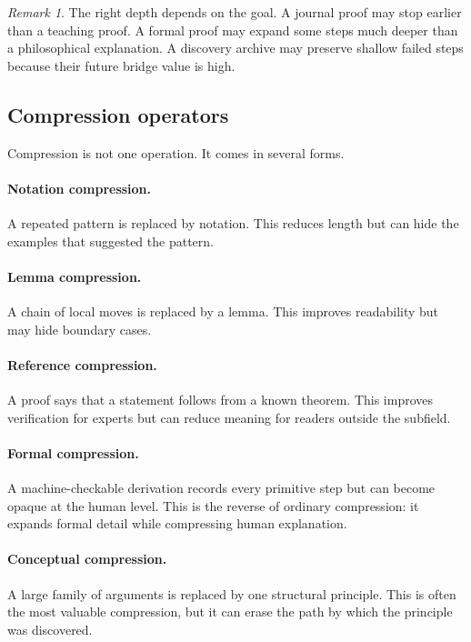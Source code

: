 \documentclass[11pt]{article}
\theoremstyle{definition}
\theoremstyle{remark}
\newtheorem{remark}[theorem]{Remark}
\begin{document}
\begin{remark}
The right depth depends on the goal.  A journal proof may stop earlier than a teaching proof.  A formal proof may expand some steps much deeper than a philosophical explanation.  A discovery archive may preserve shallow failed steps because their future bridge value is high.
\end{remark}

\subsection{Compression operators}

Compression is not one operation.  It comes in several forms.

\paragraph{Notation compression.}
A repeated pattern is replaced by notation.  This reduces length but can hide the examples that suggested the pattern.

\paragraph{Lemma compression.}
A chain of local moves is replaced by a lemma.  This improves readability but may hide boundary cases.

\paragraph{Reference compression.}
A proof says that a statement follows from a known theorem.  This improves verification for experts but can reduce meaning for readers outside the subfield.

\paragraph{Formal compression.}
A machine-checkable derivation records every primitive step but can become opaque at the human level.  This is the reverse of ordinary compression: it expands formal detail while compressing human explanation.

\paragraph{Conceptual compression.}
A large family of arguments is replaced by one structural principle.  This is often the most valuable compression, but it can erase the path by which the principle was discovered.
\end{document}
